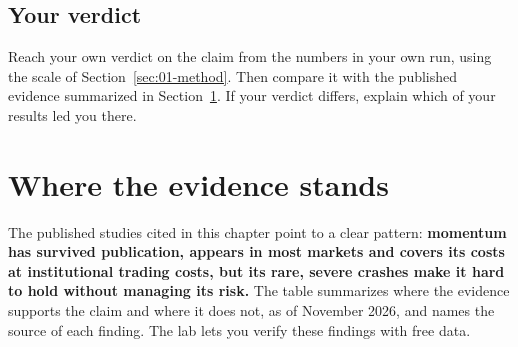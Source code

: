 \subsection*{Your verdict}

Reach your own verdict on the claim from the numbers in your own run, using the scale of Section~\ref{sec:01-method}. Then compare it with the published evidence summarized in Section~\ref{sec:05-verdict}. If your verdict differs, explain which of your results led you there.

\section{Where the evidence stands}
\label{sec:05-verdict}

The published studies cited in this chapter point to a clear pattern: \textbf{momentum has survived publication, appears in most markets and covers its costs at institutional trading costs, but its rare, severe crashes make it hard to hold without managing its risk.} The table summarizes where the evidence supports the claim and where it does not, as of November 2026, and names the source of each finding. The lab lets you verify these findings with free data.

